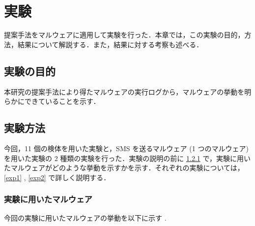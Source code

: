 \section{実験}
\label{sec:exp}
提案手法をマルウェアに適用して実験を行った．本章では，この実験の目的，方法，結果について解説する．また，結果に対する考察も述べる．
\subsection{実験の目的}
本研究の提案手法により得たマルウェアの実行ログから，マルウェアの挙動を明らかにできていることを示す．

\subsection{実験方法}
今回，11 個の検体を用いた実験と，SMS を送るマルウェア (1 つのマルウェア)を用いた実験の 2 種類の実験を行った．実験の説明の前に \ref{expmalware} で，実験に用いたマルウェアがどのような挙動を示すかを示す．それぞれの実験については， \ref{exp1} , \ref{exp2} で詳しく説明する．

\subsubsection{実験に用いたマルウェア}
\label{expmalware}
今回の実験に用いたマルウェアの挙動を以下に示す \cite{golddream} \cite{basebridge} \cite{droiddreamlight} \cite{crazyapp} \cite{icalendar} \cite{snake} \cite{trojan} .

